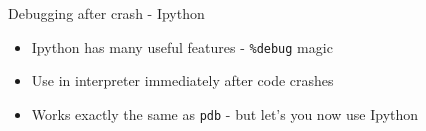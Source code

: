 \documentclass[11pt,professionalfonts]{beamer}
\begin{document}
\begin{frame}{Debugging after crash - Ipython}
    \begin{itemize}
        \item Ipython has many useful features - \texttt{\%debug} magic
            \item Use in interpreter immediately after code crashes
            \item Works exactly the same as \texttt{pdb} - but let's you now use Ipython
    \end{itemize}
\end{frame}
\end{document}
